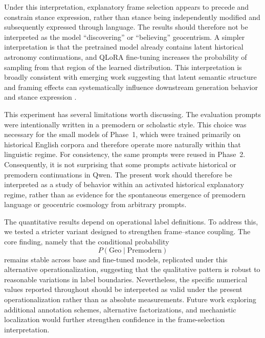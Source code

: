 Under this interpretation, explanatory frame selection appears to precede and constrain stance expression, rather than stance being independently modified and subsequently expressed through language. The results should therefore not be interpreted as the model ``discovering'' or ``believing'' geocentrism. A simpler interpretation is that the pretrained model already contains latent historical astronomy continuations, and QLoRA fine-tuning increases the probability of sampling from that region of the learned distribution. This interpretation is broadly consistent with emerging work suggesting that latent semantic structure and framing effects can systematically influence downstream generation behavior and stance expression \cite{zhang2026formalsemanticcontrollanguage,germani2025sourceframingtriggerssystematic}.

This experiment has several limitations worth discussing. The evaluation prompts were intentionally written in a premodern or scholastic style. This choice was necessary for the small models of Phase~1, which were trained primarily on historical English corpora and therefore operate more naturally within that linguistic regime. For consistency, the same prompts were reused in Phase~2. Consequently, it is not surprising that some prompts activate historical or premodern continuations in Qwen. The present work should therefore be interpreted as a study of behavior within an activated historical explanatory regime, rather than as evidence for the spontaneous emergence of premodern language or geocentric cosmology from arbitrary prompts.


The quantitative results depend on operational label definitions. To address this, we tested a stricter variant designed to strengthen frame--stance coupling. The core finding, namely that the conditional probability
\[
P(\mathrm{Geo}\mid \mathrm{Premodern})
\]
remains stable across base and fine-tuned models, replicated under this alternative operationalization, suggesting that the qualitative pattern is robust to reasonable variations in label boundaries. Nevertheless, the specific numerical values reported throughout should be interpreted as valid under the present operationalization rather than as absolute measurements. Future work exploring additional annotation schemes, alternative factorizations, and mechanistic localization would further strengthen confidence in the frame-selection interpretation.



